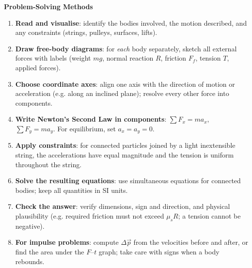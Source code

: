 \documentclass[11pt]{article}
\begin{document}
\begin{bilan}
\textbf{Problem-Solving Methods}
\begin{enumerate}
\item \textbf{Read and visualise}: identify the bodies involved, the motion described, and any constraints (strings, pulleys, surfaces, lifts).
\item \textbf{Draw free-body diagrams}: for \emph{each} body separately, sketch all external forces with labels (weight $mg$, normal reaction $R$, friction $F_f$, tension $T$, applied forces).
\item \textbf{Choose coordinate axes}: align one axis with the direction of motion or acceleration (e.g. along an inclined plane); resolve every other force into components.
\item \textbf{Write Newton's Second Law in components}: $\sum F_x = ma_x$, $\sum F_y = ma_y$. For equilibrium, set $a_x = a_y = 0$.
\item \textbf{Apply constraints}: for connected particles joined by a light inextensible string, the accelerations have equal magnitude and the tension is uniform throughout the string.
\item \textbf{Solve the resulting equations}: use simultaneous equations for connected bodies; keep all quantities in SI units.
\item \textbf{Check the answer}: verify dimensions, sign and direction, and physical plausibility (e.g. required friction must not exceed $\mu_s R$; a tension cannot be negative).
\item \textbf{For impulse problems}: compute $\Delta\vec p$ from the velocities before and after, or find the area under the $F$--$t$ graph; take care with signs when a body rebounds.
\end{enumerate}


\end{bilan}
\end{document}
